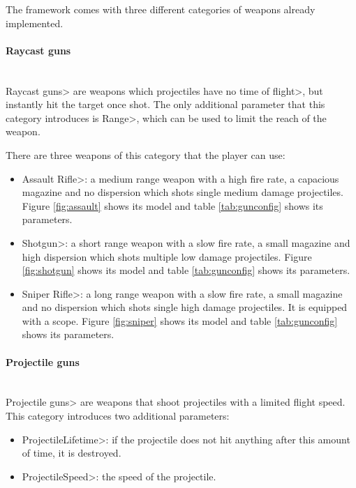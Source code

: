 \par 

The framework comes with three different categories of weapons already implemented.

\paragraph{Raycast guns}

\mbox{}\\

{\setlength{\parindent}{0cm}
\<Raycast guns> are weapons which projectiles have no \<time of flight>, but instantly hit the target once shot. The only additional parameter that this category introduces is \<Range>, which can be used to limit the reach of the weapon.
}

\par

There are three weapons of this category that the player can use:

\begin{itemize}
\item \<Assault Rifle>: a medium range weapon with a high fire rate, a capacious magazine and no dispersion which shots single medium damage projectiles. Figure \ref{fig:assault} shows its model and table \ref{tab:gunconfig} shows its parameters.
\item \<Shotgun>: a short range weapon with a slow fire rate, a small magazine and high dispersion which shots multiple low damage projectiles. Figure \ref{fig:shotgun} shows its model and table \ref{tab:gunconfig} shows its parameters.
\item \<Sniper Rifle>: a long range weapon with a slow fire rate, a small magazine and no dispersion which shots single high damage projectiles. It is equipped with a scope. Figure \ref{fig:sniper} shows its model and table \ref{tab:gunconfig} shows its parameters.
\end{itemize}

\paragraph{Projectile guns}

\mbox{}\\

{\setlength{\parindent}{0cm}
\<Projectile guns> are weapons that shoot projectiles with a limited flight speed. This category introduces two additional parameters:
}

\begin{itemize}
\item \<ProjectileLifetime>: if the projectile does not hit anything after this amount of time, it is destroyed.
\item \<ProjectileSpeed>: the speed of the projectile.
\end{itemize}

